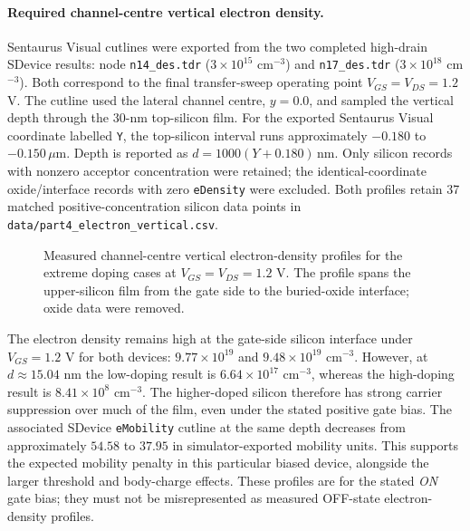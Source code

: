 \paragraph{Required channel-centre vertical electron density.}
Sentaurus Visual cutlines were exported from the two completed
high-drain SDevice results: node \texttt{n14\_des.tdr}
($3\times10^{15}$ cm$^{-3}$) and \texttt{n17\_des.tdr}
($3\times10^{18}$ cm$^{-3}$). Both correspond to the final
transfer-sweep operating point $V_{GS}=V_{DS}=1.2$ V.
The cutline used the lateral channel centre, $y=0.0$,
and sampled the vertical depth through the
30-nm top-silicon film. For the exported Sentaurus Visual
coordinate labelled \texttt{Y}, the top-silicon interval
runs approximately $-0.180$ to $-0.150\,\mu$m.
Depth is reported as
$d=1000(Y+0.180)\,$nm.
Only silicon records with nonzero acceptor concentration
were retained; the identical-coordinate oxide/interface
records with zero \texttt{eDensity} were excluded.
Both profiles retain 37 matched positive-concentration
silicon data points in
\texttt{data/part4\_electron\_vertical.csv}.

\begin{figure}[H]\centering
{}
\caption{Measured channel-centre vertical electron-density profiles
for the extreme doping cases at $V_{GS}=V_{DS}=1.2$ V.
The profile spans the upper-silicon film from the gate side
to the buried-oxide interface; oxide data were removed.}
\end{figure}

The electron density remains high at the gate-side silicon interface
under $V_{GS}=1.2$ V for both devices:
$9.77\times10^{19}$ and $9.48\times10^{19}$ cm$^{-3}$.
However, at $d\approx15.04$ nm the
low-doping result is $6.64\times10^{17}$ cm$^{-3}$,
whereas the high-doping result is
$8.41\times10^8$ cm$^{-3}$. The higher-doped silicon
therefore has strong carrier suppression over much of the film,
even under the stated positive gate bias.
The associated SDevice \texttt{eMobility} cutline
at the same depth decreases from approximately
$54.58$ to $37.95$ in simulator-exported mobility units.
This supports the expected mobility penalty in this
particular biased device, alongside the larger threshold
and body-charge effects. These profiles are for the stated
\emph{ON} gate bias; they must not be misrepresented as
measured OFF-state electron-density profiles.

